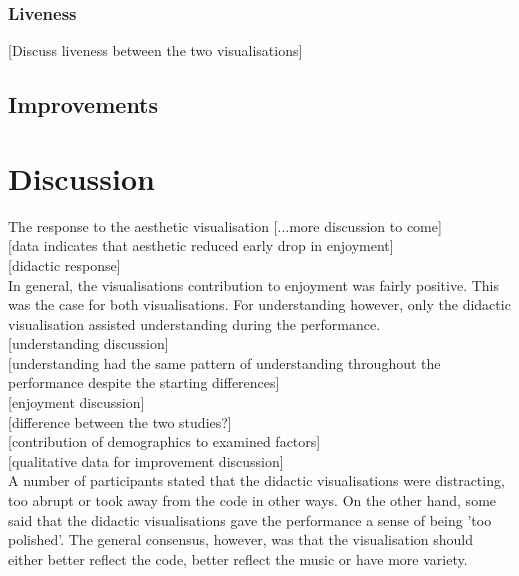 \documentclass{article}
\begin{document}
\subsubsection{Liveness}

[Discuss liveness between the two visualisations]

\subsection{Improvements}


\section{Discussion}

The response to the aesthetic visualisation [...more discussion to come]\\

[data indicates that aesthetic reduced early drop in enjoyment]\\

[didactic response]\\

In general, the visualisations contribution to enjoyment was fairly positive. This was the case for both visualisations. For understanding however, only the didactic visualisation assisted understanding during the performance.\\

[understanding discussion]\\

[understanding had the same pattern of understanding throughout the performance despite the starting differences]\\

[enjoyment discussion]\\

[difference between the two studies?]\\

[contribution of demographics to examined factors]\\

[qualitative data for improvement discussion]\\


A number of participants stated that the didactic visualisations were distracting, too abrupt or took away from the code in other ways. On the other hand, some said that the didactic visualisations gave the performance a sense of being 'too polished'. The general consensus, however, was that the visualisation should either better reflect the code, better reflect the music or have more variety.\\
\end{document}
